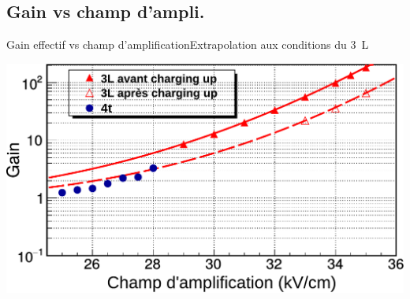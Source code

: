   \subsection{Gain vs champ d'ampli.}

    \begin{frame}{Gain effectif vs champ d'amplification}{Extrapolation aux conditions du \SI{3}{\liter}}
        \begin{scriptsize}
            \centering \includegraphics[width=\textwidth]{./pictures/gain_vs_ampli.pdf} \\
        \end{scriptsize}
    \end{frame}
    
